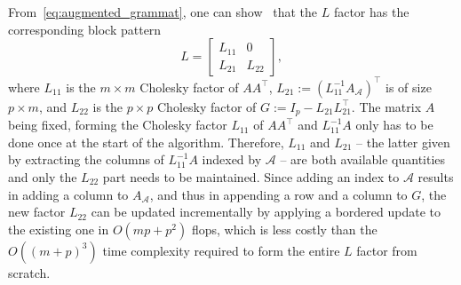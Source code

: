\documentclass{article}
\numberwithin{equation}{section}
\newcommand{\calA}{{\mathcal{A}}}
\theoremstyle{plain}
\begin{document}
From~\eqref{eq:augmented_grammat}, one can show~\cite[Section~4.2.9]{golubvanloan:2013} that the $L$ factor has the corresponding block pattern
\[L = \begin{bmatrix}
	L_{11} & 0 \\ L_{21} & L_{22}
\end{bmatrix},\]
where 
$L_{11}$ is the $m \times m$ Cholesky factor of $AA^\top$, $L_{21} := (L_{11}^{-1} A_{\calA})^\top$ is of size $p \times m$, and $L_{22}$ is the $p \times p$ Cholesky factor of $G := I_p - L_{21}L_{21}^\top$.
The matrix $A$ being fixed, forming the Cholesky factor $L_{11}$ of $AA^\top$ and $L_{11}^{-1} A$ only has to be done once at the start of the algorithm. Therefore, $L_{11}$ and $L_{21}$ -- the latter given by extracting the columns of $L_{11}^{-1} A$ indexed by $\calA$ -- are both available quantities and only the $L_{22}$ part needs to be maintained. Since adding an index to $\calA$ results in adding a column to $A_\calA$, and thus in appending a row and a column to $G$, the new factor $L_{22}$ can be updated incrementally by applying a bordered update to the existing one in $O(mp+p^2)$ flops, which is less costly than the $O((m+p)^3)$ time complexity required to form the entire $L$ factor from scratch.
\end{document}
